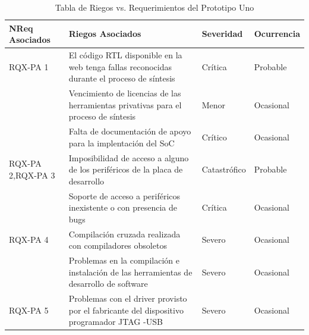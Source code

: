 		\begin{table}[h!]
		\centering
		\begin{tabular}{ p{2.5cm} p{9cm} p{2cm} p{2cm} }
		\hline 
		\rowcolor[gray]{0.8} N\textordmasculine Req Asociados& Riegos Asociados & Severidad  & Ocurrencia \\
		\hline
		RQX-PA 1& El código RTL disponible en la web tenga fallas reconocidas durante el proceso de síntesis & Crítica       & Probable \\
		\hline
				& Vencimiento de licencias de las herramientas privativas para el proceso de síntesis  & Menor  & Ocasional\\	 
		\hline
				& Falta de documentación de apoyo para la implentación
del SoC & Crítico & Ocasional\\	 
		\hline

		RQX-PA 2,RQX-PA 3 & Imposibilidad de acceso a alguno de los periféricos de la placa de desarrollo &  Catastrófico  & Probable\\
		\hline
		& Soporte de acceso a periféricos inexistente o con presencia
de bugs & Crítica  & Ocasional\\	 
		\hline
		RQX-PA 4& Compilación cruzada realizada con compiladores obsoletos & Severo  &  Ocasional\\ 
		\hline
		&Problemas en la compilación e instalación de las herramientas de desarrollo de software  & Severo  &  Ocasional\\ 
		\hline
		RQX-PA 5& Problemas con el driver provisto por el fabricante del  dispositivo programador JTAG -USB & Severo&  Ocasional\\
		\hline
		\end{tabular}
		\caption{Tabla de Riegos vs. Requerimientos del Prototipo Uno}
		\end{table}



